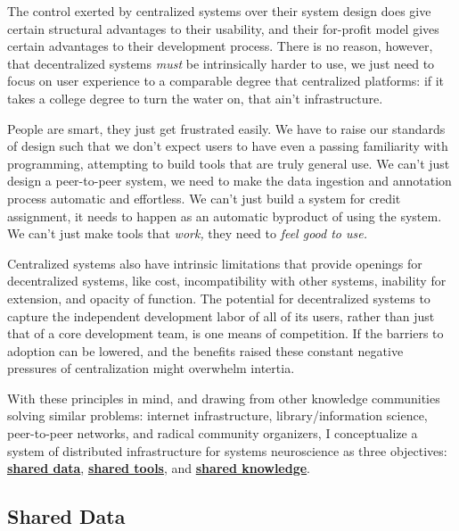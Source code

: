\documentclass[10pt]{article}
\begin{document}
\begin{multicols}{2}
The control exerted by centralized systems over their system design does
give certain structural advantages to their usability, and their
for-profit model gives certain advantages to their development process.
There is no reason, however, that decentralized systems \emph{must} be
intrinsically harder to use, we just need to focus on user experience to
a comparable degree that centralized platforms: if it takes a college
degree to turn the water on, that ain't infrastructure.

People are smart, they just get frustrated easily. We have to raise our
standards of design such that we don't expect users to have even a
passing familiarity with programming, attempting to build tools that are
truly general use. We can't just design a peer-to-peer system, we need
to make the data ingestion and annotation process automatic and
effortless. We can't just build a system for credit assignment, it needs
to happen as an automatic byproduct of using the system. We can't just
make tools that \emph{work,} they need to \emph{feel good to use.}

Centralized systems also have intrinsic limitations that provide
openings for decentralized systems, like cost, incompatibility with
other systems, inability for extension, and opacity of function. The
potential for decentralized systems to capture the independent
development labor of all of its users, rather than just that of a core
development team, is one means of competition. If the barriers to
adoption can be lowered, and the benefits raised these constant negative
pressures of centralization might overwhelm intertia.

With these principles in mind, and drawing from other knowledge
communities solving similar problems: internet infrastructure,
library/information science, peer-to-peer networks, and radical
community organizers, I conceptualize a system of distributed
infrastructure for systems neuroscience as three objectives:
\protect\hyperlink{shared-data}{\textbf{shared data}},
\protect\hyperlink{shared-tools}{\textbf{shared tools}}, and
\protect\hyperlink{shared-knowledge}{\textbf{shared knowledge}}.

\end{multicols}


\hypertarget{shared-data}{%
\subsection{Shared Data}\label{shared-data}}
\end{document}
